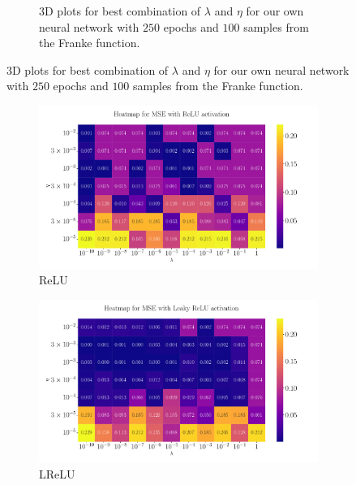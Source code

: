 \documentclass[%
reprint,
amsmath,amssymb,
aps,
]{revtex4-2}
\begin{document}
\begin{figure}[ht!]
\begin{subfigure}[b]{0.49\textwidth}
	\caption{3D plots for best combination of $\lambda$ and $\eta$ for our own neural network with $250$ epochs and $100$ samples from the Franke function.}
	\label{fig:NN_noKeras_3D_Franke_Epochs250}
\end{subfigure}
\end{figure}

\begin{figure}[ht!]
	\begin{subfigure}{0.4353\textwidth}
		\includegraphics[width=\textwidth]{Python/Figures/Heatmap_MSE_ReLU_Franke_Epochs250.pdf}
		\caption{ReLU}
	\end{subfigure}
	\hfill
	\begin{subfigure}{0.4353\textwidth}
		\includegraphics[width=\textwidth]{Python/Figures/Heatmap_MSE_Leaky ReLU_Franke_Epochs250.pdf}
		\caption{LReLU}
	\end{subfigure}
	\hfill\newline
	\begin{subfigure}{0.4353\textwidth}

\end{subfigure}
\end{figure}
\end{document}
